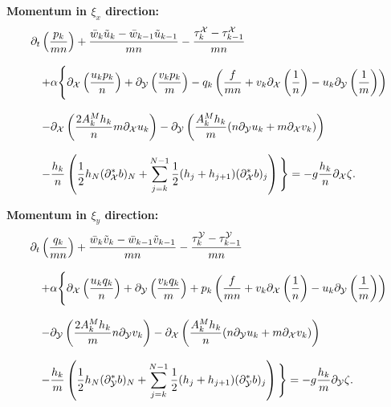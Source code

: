 {\bf Momentum in $\xi_x$ direction:} 
\begin{equation}\label{uEqviCurvi}
\begin{array}{l}
\displaystyle 
\partial_t \left(\frac{p_k}{mn}\right)  
+\frac{\bar w_k \tilde u_k -\bar w_{k-1} \tilde u_{k-1}}{mn}  
-\frac{\tau^{\cal X}_k - \tau^{\cal X}_{k-1}}{mn}  
\\ \\ \quad
\displaystyle 
+\alpha\Bigg\{\partial_{\cal X}\left(\frac{u_kp_k}{n}\right)
+\partial_{\cal Y}\left(\frac{v_kp_k}{m}\right)
- q_k \left(\frac{f}{mn}+v_k\partial_{\cal X}\left(\frac{1}{n}\right)
-u_k\partial_{\cal Y}\left(\frac{1}{m}\right) \right)  
\\ \\ \quad
\displaystyle
-\partial_{\cal X}\left(\frac{2A_k^Mh_k}{n} m\partial_{\cal X}u_k\right)
-\partial_{\cal Y}\left(\frac{A_k^Mh_k}{m}
(n\partial_{\cal Y}u_k+m\partial_{\cal X}v_k)\right)
\\ \\ \quad
\displaystyle
-\frac{h_k}{n}\left(
\frac12h_N(\partial^*_{\cal X}b)_N
+\sum_{j=k}^{N-1}\frac12(h_j+h_{j+1})(\partial^*_{\cal X}b)_j
\right)\Bigg\}
=
-g\frac{h_k}{n}\partial_{\cal X}\zeta.
\end{array}
\end{equation}

{\bf Momentum in $\xi_y$ direction:} 
\begin{equation}\label{vEqviCurvi}
\begin{array}{l}
\displaystyle 
\partial_t \left(\frac{q_k}{mn}\right)  
+\frac{\bar w_k \tilde v_k -\bar w_{k-1} \tilde v_{k-1}}{mn}  
-\frac{\tau^{\cal Y}_k - \tau^{\cal Y}_{k-1}}{mn}  
\\ \\ \quad
\displaystyle 
+\alpha\Bigg\{\partial_{\cal X}\left(\frac{u_kq_k}{n}\right)
+\partial_{\cal Y}\left(\frac{v_kq_k}{m}\right)
+ p_k \left(\frac{f}{mn}+v_k\partial_{\cal X}\left(\frac{1}{n}\right)
-u_k\partial_{\cal Y}\left(\frac{1}{m}\right) \right)  
\\ \\ \quad
\displaystyle
-\partial_{\cal Y}\left(\frac{2A_k^Mh_k}{m} n\partial_{\cal Y}v_k\right)
-\partial_{\cal X}\left(\frac{A_k^Mh_k}{n}
(n\partial_{\cal Y}u_k+m\partial_{\cal X}v_k)\right)
\\ \\ \quad
\displaystyle
-\frac{h_k}{m}\left(
\frac12h_N(\partial^*_{\cal Y}b)_N
+\sum_{j=k}^{N-1}\frac12(h_j+h_{j+1})(\partial^*_{\cal Y}b)_j
\right)\Bigg\}
=
-g\frac{h_k}{m}\partial_{\cal Y}\zeta.
\end{array}
\end{equation}


